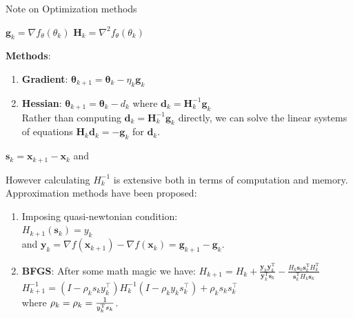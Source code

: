 \documentclass{beamer}
\begin{document}
\begin{frame}[allowframebreaks]{Note on Optimization methods}

    \begin{center} 
        $\mathbf{g}_k = \nabla f_{\theta}(\theta_k) $ \hspace{10mm}
        $\mathbf{H}_k = \nabla^{2} f_{\theta}(\theta_k)$
    \end{center}

    \textbf{Methods}:
    \begin{enumerate}
        \item \textbf{Gradient}: $\boldsymbol{\theta}_{k+1} = 
            \boldsymbol{\theta}_k - \eta_k \mathbf{g}_k$
        \item \textbf{Hessian}: $\boldsymbol{\theta}_{k+1} = \boldsymbol{\theta}_k - d_k$
            where $\mathbf{d}_k = \mathbf{H}_k^{-1} \mathbf{g}_k$ \\
            Rather than computing $\mathbf{d}_k = \mathbf{H}_k^{-1} \mathbf{g}_k$ directly,
            we can solve the linear systems of equations 
            $\mathbf{H}_k \mathbf{d}_k = -\mathbf{g}_k$ for $\mathbf{d}_k$.
    \end{enumerate}
    \newpage
    \begin{center}
        $\mathbf{s}_k = \mathbf {x} _{k+1}-\mathbf {x} _{k}$ and 
    \end{center}
    However calculating $H^{-1}_k$ is extensive both in terms of computation and
    memory. Approximation methods have been proposed:
    \begin{enumerate}
        \item Imposing quasi-newtonian condition: \\
            $H_{k+1}(\mathbf{s}_k)=y_k$\\
            and $\mathbf{y}_k = \nabla f(\mathbf {x} _{k+1})-
            \nabla f(\mathbf {x} _{k})
            = \mathbf{g}_{k+1} - \mathbf{g}_{k}$. \\
        \item \textbf{BFGS}: After some math magic we have:
            $H_{k+1}=H_{k}+{\frac {\mathbf {y} _{k}\mathbf {y} _{k}
            ^{\mathrm {T} }}{\mathbf {y} _{k}^{\mathrm {T} }
            \mathbf {s} _{k}}}-{\frac {H_{k}\mathbf {s} _{k}\mathbf {s} _{k}^
            {\mathrm {T} }H_{k}^{\mathrm {T} }}{\mathbf {s} _{k}^
            {\mathrm {T} }H_{k}\mathbf {s} _{k}}}$\\
            $H^{-1}_{k+1}=(I-\rho _{k}s_{k}y_{k}^{\top })
            H^{-1}_{k}(I-\rho _{k}y_{k}s_{k}^{\top })+\rho _{k}s_{k}s_{k}^{\top }$\\
            where $\rho_k = \rho_k = \frac{1}{y^{\rm T}_k s_k} $.
    \end{enumerate}

\end{frame}
\end{document}
